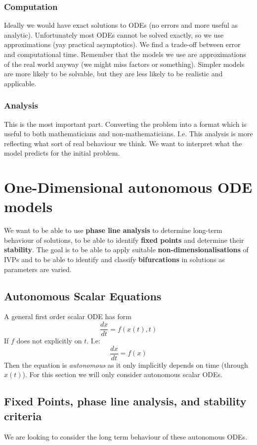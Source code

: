 \documentclass{X:/Documents/Coding/Latex/myassignment}
\begin{document}
\subsubsection{Computation}
Ideally we would have exact solutions to ODEs (no errors and more useful as analytic). Unfortunately most ODEs cannot be solved exactly, so we use approximations (yay practical asymptotics). We find a trade-off between error and computational time. Remember that the models we use are approximations of the real world anyway (we might miss factors or something).
Simpler models are more likely to be solvable, but they are less likely to be realistic and applicable.



\subsubsection{Analysis}
This is the most important part. Converting the problem into a format which is useful to both mathematicians and non-mathematicians. I.e. This analysis is more reflecting what sort of real behaviour we think. We want to interpret what the model predicts for the initial problem. 




\section{One-Dimensional autonomous ODE models}
We want to be able to use \textbf{phase line analysis} to determine long-term behaviour of solutions, to be able to identify \textbf{fixed points} and determine their \textbf{stability}. The goal is to be able to apply suitable \textbf{non-dimensionalisations} of IVPs and to be able to identify and classify \textbf{bifurcations} in solutions as parameters are varied.
\subsection{Autonomous Scalar Equations}
A general first order scalar ODE has form
\[\frac{dx}{dt} = f(x(t),t)\]
If $f$ does not explicitly on $t$. I.e:
\[\frac{dx}{dt} = f(x)\]
Then the equation is \textit{autonomous} as it only implicitly depends on time (through $x(t)$). For this section we will only consider autonomous scalar ODEs.






\subsection{Fixed Points, phase line analysis, and stability criteria}
We are looking to consider the long term behaviour of these autonomous ODEs.
\end{document}
